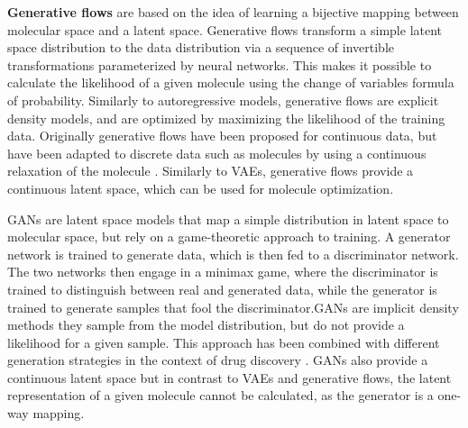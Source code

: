 \textbf{Generative flows} \citep{rezendeVariationalInferenceNormalizing2016} are based on the
idea of learning a bijective mapping between molecular space and a latent space. Generative flows
transform a simple latent space distribution to the data distribution via a sequence of invertible
transformations parameterized by neural networks. This makes it possible to calculate the likelihood
of a given molecule using the change of variables formula of probability. Similarly to
autoregressive models, generative flows are explicit density models, and are optimized by maximizing
the likelihood of the training data. Originally generative flows have been proposed for continuous
data, but have been adapted to discrete data such as molecules by using a continuous relaxation of
the molecule \citep{madhawaGraphNVPInvertibleFlow2019}. Similarly to \acp{VAE}, generative flows provide
a continuous latent space, which can be used for molecule optimization.

\Acp{GAN} \citep{goodfellowGenerativeAdversarialNetworks2014}
are latent space models that map a simple distribution in latent space to molecular space, but rely
on a game-theoretic approach to training. A generator network is trained to generate data, which is
then fed to a discriminator network. The two networks then engage in a minimax game, where the
discriminator is trained to distinguish between real and generated data, while the generator is
trained to generate samples that fool the discriminator.\@ \Acp{GAN} are implicit density methods they
sample from the model distribution, but do not provide a likelihood for a given sample. This
approach has been combined with different generation strategies in the context of drug discovery
\citep{decaoMolGANImplicitGenerative2018,kadurinDruGANAdvancedGenerative2017,guimaraesObjectiveReinforcedGenerativeAdversarial2017,mendez-lucioNovoGenerationHitlike2018,tangMolecularGenerativeAdversarial2024}.
GANs also provide a continuous latent space but in contrast to VAEs and generative flows, the latent
representation of a given molecule cannot be calculated, as the generator is a one-way mapping.


